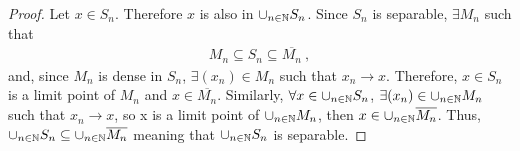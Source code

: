 \begin{questions}


\begin{solution}
  \begin{proof}
 Let $x\in S_n$. Therefore $x$ is also in $\cup_{n\in\mathbb{N}}S_n$. Since $S_n$ is separable, $\exists M_n$ such that
 \begin{align*}
 M_n\subseteq S_n\subseteq \overline{M_n}~,
 \end{align*}
 and, since $M_n$ is dense in $S_n$, $\exists (x_n)\in M_n$ such that $x_n\rightarrow x$. Therefore, $x\in S_n$ is a limit point of $M_n$ and $x\in\overline{M_n}$. Similarly, $\forall x\in\cup_{n\in\mathbb{N}}S_n$, $\exists (x_n)\in\cup_{n\in\mathbb{N}}M_n$ such that $x_n\rightarrow x$, so x is a limit point of $\cup_{n\in\mathbb{N}} M_n$, then $x\in\cup_{n\in\mathbb{N}}\overline{M_n}$.
 Thus, $\cup_{n\in\mathbb{N}} S_n\subseteq\cup_{n\in\mathbb{N}}\overline{M_n}$ meaning that $\cup_{n\in\mathbb{N}}S_n$ is separable.  \end{proof}
\end{solution}


\end{questions}